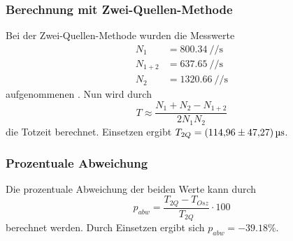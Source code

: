 \subsubsection*{Berechnung mit Zwei-Quellen-Methode}
        Bei der Zwei-Quellen-Methode wurden die Messwerte
        \begin{align*}
            N_1 &= \SI{800.34}{\per\per\second}\\ %
            N_{1+2} &= \SI{637.65}{\per\per\second}\\
            N_2 &= \SI{1320.66}{\per\per\second}
        \end{align*}
        aufgenommenen \cite{AP02}. Nun wird durch 
        \begin{equation*}
            T\approx \frac{N_1+N_2-N_{1+2}}{2N_1N_2}
        \end{equation*}
        die Totzeit berechnet. Einsetzen ergibt $T_{2Q}=\SI{114.96 \pm 47.27}{\micro\second}$.
\subsubsection*{Prozentuale Abweichung}
Die prozentuale Abweichung der beiden Werte kann durch 
\begin{equation}
    p_{abw}=\frac{T_{2Q}-T_{Osz}}{T_{2Q}}\cdot 100
\end{equation}
berechnet werden. Durch Einsetzen ergibt sich $p_{abw}=\num{-39.18}\%$.

